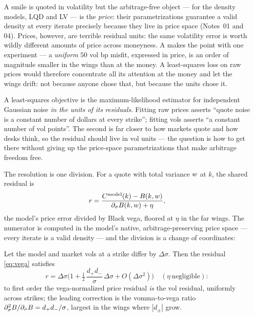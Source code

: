 \documentclass[11pt]{article}
\begin{document}
A smile is quoted in volatility but the arbitrage-free object --- for the
density models, LQD and LV --- is the \emph{price}: their parametrizations
guarantee a valid density at every iterate precisely because they live in
price space (Notes~01 and 04).  Prices, however, are terrible residual
units: the same volatility error is worth wildly different amounts of
price across moneyness.  A makes the point with one
experiment --- a \emph{uniform} $50$ vol bp misfit, expressed in price,
is an order of magnitude smaller in the wings than at the money.  A
least-squares loss on raw prices would therefore concentrate all its
attention at the money and let the wings drift: not because anyone chose
that, but because the units chose it.

\begin{heuristic}
A least-squares objective is the maximum-likelihood estimator for
independent Gaussian noise \emph{in the units of its residuals}.  Fitting
raw prices asserts ``quote noise is a constant number of dollars at every
strike''; fitting vols asserts ``a constant number of vol points''.  The
second is far closer to how markets quote and how desks think, so the
residual should live in vol units --- the question is how to get there
without giving up the price-space parametrizations that make arbitrage
freedom free.
\end{heuristic}

The resolution is one division.  For a quote with total variance $w$
at $k$, the shared residual is
\begin{equation}
r=\frac{C^{\text{model}}(k)-B(k,w)}
{\partial_\sigma B(k,w)+\eta},
\label{eq:vega}
\end{equation}
the model's price error divided by Black vega, floored at $\eta$ in the
far wings.  The numerator is computed in the model's native,
arbitrage-preserving price space --- every iterate is a valid density ---
and the division is a change of coordinates:

\begin{proposition}
\label{prop:units}
Let the model and market vols at a strike differ by $\Delta\sigma$.  Then
the residual \eqref{eq:vega} satisfies
\begin{equation}
r=\Delta\sigma\Big(1+\tfrac12\,\frac{d_+d_-}{\sigma}\,\Delta\sigma
+O(\Delta\sigma^2)\Big)\quad(\eta\ \text{negligible}):
\label{eq:dict}
\end{equation}
to first order the vega-normalized price residual \emph{is} the vol
residual, uniformly across strikes; the leading correction is the
vomma-to-vega ratio $\partial^2_\sigma B/\partial_\sigma B
=d_+d_-/\sigma$, largest in the wings where $|d_\pm|$ grow.
\end{proposition}
\end{document}
